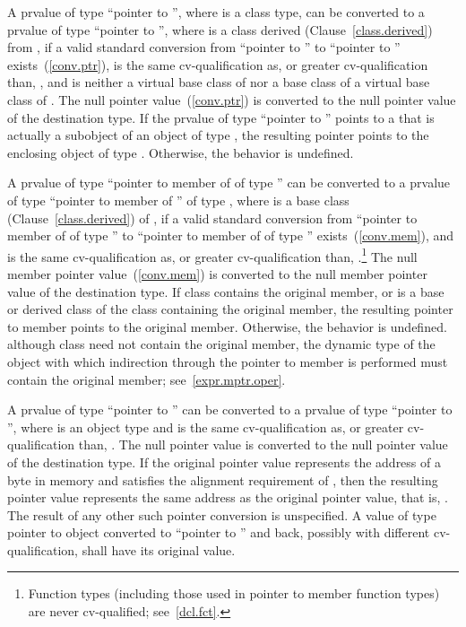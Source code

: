 \pnum
{}%
%
A prvalue of type ``pointer to  '', where 
is a class type, can be converted to a prvalue of type ``pointer to
 '', where  is a class derived
(Clause~\ref{class.derived}) from , if a valid standard
conversion from ``pointer to '' to ``pointer to ''
exists~(\ref{conv.ptr}),  is the same cv-qualification as,
or greater cv-qualification than, , and  is neither
a virtual base class of  nor a base class of a virtual base
class of . The null pointer value~(\ref{conv.ptr}) is converted
to the null pointer value of the destination type. If the prvalue of type
``pointer to  '' points to a  that is
actually a subobject of an object of type , the resulting
pointer points to the enclosing object of type . Otherwise, the
behavior is undefined.

\pnum
{}%
A prvalue of type ``pointer to member of  of type 
'' can be converted to a prvalue of type ``pointer to member of
'' of type  , where  is a base
class (Clause~\ref{class.derived}) of , if a valid standard
conversion from ``pointer to member of  of type '' to
``pointer to member of  of type ''
exists~(\ref{conv.mem}), and  is the same cv-qualification
as, or greater cv-qualification than, .\footnote{Function types
(including those used in pointer to member function
types) are never cv-qualified; see~\ref{dcl.fct}.}
The null member pointer value~(\ref{conv.mem}) is converted to the null
member pointer value of the destination type. If class 
contains the original member, or is a base or derived class of the class
containing the original member, the resulting pointer to member points
to the original member. Otherwise, the behavior is undefined.
\enternote 
although class  need not contain the original member, the
dynamic type of the object with which indirection through the pointer
to member is performed must contain the original member;
see~\ref{expr.mptr.oper}.
\exitnote 

\pnum
A prvalue of type ``pointer to  '' can be
converted to a prvalue of type ``pointer to  '',
where  is an object type and  is the same
cv-qualification as, or greater cv-qualification than, . The
null pointer value is converted to the null pointer value of the
destination type. If the original pointer value represents the address
 of a byte in memory and  satisfies the alignment
requirement of , then the resulting pointer value represents the same
address as the original pointer value, that is, . The result of any
other such pointer conversion is unspecified.
A value of type pointer to object converted to
``pointer to  '' and back, possibly with
different cv-qualification, shall have its original value.
\enterexample

